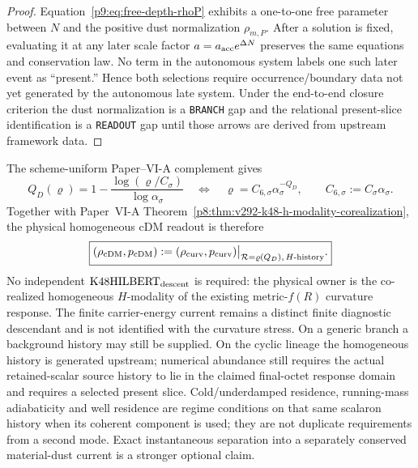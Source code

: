 \documentclass[12pt,a4paper]{article}
\begin{document}
\begin{proof}
Equation~\eqref{p9:eq:free-depth-rhoP} exhibits a one-to-one free parameter
between \(N\) and the positive dust normalization \(\rho_{m,P}\).  After a
solution is fixed, evaluating it at any later scale factor
\(a=a_{\rm acc}e^{\Delta N}\) preserves the same equations and conservation
law.  No term in the autonomous system labels one such later event as
``present.''  Hence both selections require occurrence/boundary data not yet
generated by the autonomous late system.  Under the end-to-end closure
criterion the dust normalization is a \texttt{BRANCH} gap and the relational
present-slice identification is a \texttt{READOUT} gap until those arrows are
derived from upstream framework data.
\end{proof}

\begin{proposition}
\label{p9:prop:k48-pullback-no-dust-normalization}
The scheme-uniform Paper--VI-A complement gives
\[
 Q_D(\varrho)
 =1-\frac{\log(\varrho/C_\sigma)}{\log\alpha_\sigma}
 \quad\Longleftrightarrow\quad
 \boxed{\varrho=C_{6,\sigma}\alpha_\sigma^{-Q_D}},
 \qquad C_{6,\sigma}:=C_\sigma\alpha_\sigma.
\]
Together with Paper~VI-A
Theorem~\ref{p8:thm:v292-k48-h-modality-corealization}, the physical
homogeneous cDM readout is therefore
\[
 \boxed{
 (\rho_{\rm cDM},p_{\rm cDM})
 :=(\rho_{\rm curv},p_{\rm curv})
 \big|_{\mathcal R=\varrho(Q_D),\,H\text{-history}}.}
\]
No independent \(\mathrm{K48HILBERT}_{\rm descent}\) is required: the
physical owner is the co-realized homogeneous $H$-modality of the existing
metric-$f(R)$ curvature response.  The finite carrier-energy current remains a
distinct finite diagnostic descendant and is not identified with the curvature
stress.  On a generic branch a background history may still be supplied.  On
the cyclic lineage the homogeneous history is generated upstream; numerical
abundance still requires the actual retained-scalar source history to lie in
the claimed final-octet response domain and requires a selected present slice.
Cold/underdamped residence, running-mass adiabaticity and well residence are
regime conditions on that same scalaron history when its coherent component is
used; they are not duplicate requirements from a second mode.  Exact instantaneous separation into a
separately conserved material-dust current is a stronger optional claim.
\end{proposition}
\end{document}
